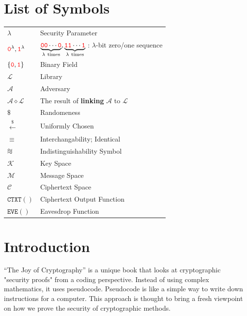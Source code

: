 \documentclass[12pt,openany]{book}
\theoremstyle{definition}
\newcommand{\keyspace}{\mathcal{K}}
\newcommand{\messagespace}{\mathcal{M}}
\newcommand{\ciphertextspace}{\mathcal{C}}
\newcommand{\library}{\mathcal{L}}
\newcommand{\zero}{\textcolor{red}{\texttt{0}}}
\newcommand{\one}{\textcolor{red}{\texttt{1}}}
\newcommand{\adversary}{\mathcal{A}}
\newcommand{\linking}{\diamond}
\newcommand{\randomness}{\$}
\newcommand{\uniform}{\xleftarrow{\randomness}}
\newcommand{\binaryfield}{\set{\zero,\one}}
\newcommand*{\indist}{%
	\mathrel{\vcenter{\offinterlineskip
			\hbox{$\sim$}\vskip-.35ex\hbox{$\sim$}\vskip-.35ex\hbox{$\sim$}}}}
\begin{document}
	\newpage
	\tableofcontents
	
	\mainmatter
	
	\chapter*{List of Symbols}
	
	\begin{tabular}{ll}
		\( \lambda \) & Security Parameter \\
		\( \zero^\lambda, \one^\lambda\) & \(\underbrace{\zero\zero\cdots\zero}_{\lambda\ \text{times}}, \underbrace{\one\one\cdots\one}_{\lambda\ \text{times}}\) : \(\lambda\)-bit zero/one sequence \\
		\( \binaryfield \) & Binary Field \\
		\( \library \) & Library \\
		\( \adversary \) & Adversary \\		
		\( \adversary\linking\library \) & The result of \textbf{linking} $\adversary$ to  $\library$ \\
		\( \randomness \) & Randomeness \\
		\( \uniform \) & Uniformly Chosen \\
		\( \equiv \) & Interchangability; Identical\\
		\( \indist \) & Indistinguishability Symbol\\
		\( \keyspace \) & Key Space\\
		\( \messagespace \) & Message Space\\
		\( \ciphertextspace \) & Ciphertext Space\\
		\( \texttt{CTXT}() \) & Ciphertext Output Function\\
		\( \texttt{EVE}() \) & Eavesdrop Function\\
	\end{tabular}
	
	\chapter*{Introduction}
	
	``The Joy of Cryptography'' is a unique book that looks at cryptographic "security proofs" from a coding perspective. Instead of using complex mathematics, it uses pseudocode. Pseudocode is like a simple way to write down instructions for a computer. This approach is thought to bring a fresh viewpoint on how we prove the security of cryptographic methods.
	
\end{document}
